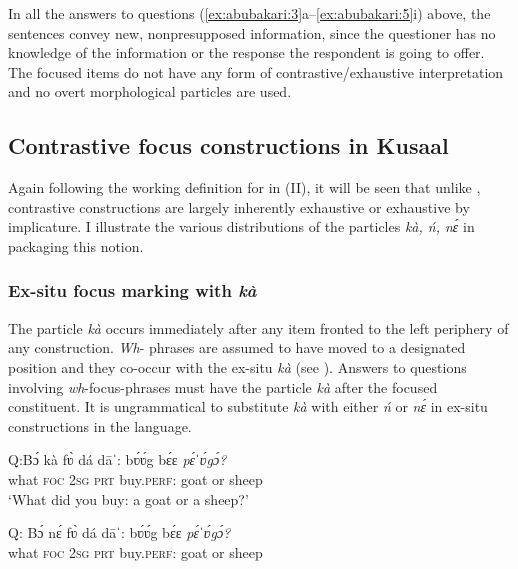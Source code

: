\documentclass[output=paper,modfonts,nonflat,
 hidelinks
]{langsci/langscibook}
\begin{document}
In all the answers to questions (\ref{ex:abubakari:3}a--\ref{ex:abubakari:5}i) above, the sentences convey new, nonpresupposed information, since the questioner has no knowledge of the information or the response the respondent is going to offer. The focused items do not have any form of contrastive{\slash}exhaustive interpretation and no overt morphological  particles are used. 

\subsection{Contrastive focus constructions in {Kusaal}}\label{sec:abubakari:2.2}

Again following the working definition for  in (II), it will be seen that unlike , contrastive  constructions are largely inherently exhaustive or exhaustive by implicature. I illustrate the various distributions of the particles \textit{kà, ń, nɛ́} in packaging this notion.

\subsubsection{Ex-situ focus marking with \textit{kà}}

The particle \textit{kà} occurs immediately after any item fronted to the left periphery of any construction. \textit{Wh}{}- phrases are assumed to have moved to a designated  position and they co-occur with the ex-situ  \textit{kà} (see \citealt{aboh2007}). Answers to questions involving \textit{wh}{}-focus-phrases must have the particle \textit{kà} after the focused constituent. It is ungrammatical to substitute \textit{kà} with either \textit{ń} or \textit{nɛ́} in ex-situ  constructions in the language. 

 
\ea\label{ex:abubakari:6}
\ea \label{ex:abubakari:6a} 
Q:\gll Bɔ́  kà  fʋ̀  dá  dāˈ:    bʋ́ʋ́g  bɛ́ɛ  \textit{pɛ́ˈʋ́gɔ́?}\\  
what  \textsc{foc}  2\textsc{sg}  \textsc{prt}  buy.\textsc{perf}:  goat  or 
sheep          \\
\glt ‘What did you buy: a goat or a sheep?’ 

\ex \label{ex:abubakari:6b} 
Q: \gll *Bɔ́  nɛ́  fʋ̀  dá  dāˈ:    bʋ́ʋ́g  bɛ́ɛ \textit{pɛ́ˈʋ́gɔ́?}\\
 what  \textsc{foc}  2\textsc{sg}  \textsc{prt}  buy.\textsc{perf}:  goat  or  sheep\\
  
\end{document}
